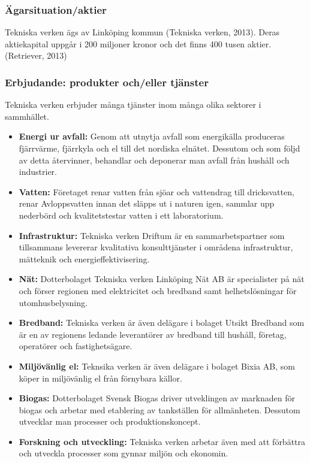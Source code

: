 \documentclass[10pt,a4paper]{article}
\begin{document}
\subsubsection{Ägarsituation/aktier}
Tekniska verken ägs av Linköping kommun (Tekniska verken, 2013). Deras
aktiekapital uppgår i 200 miljoner kronor och det finns 400 tusen
aktier.(Retriever, 2013)

\subsubsection{Erbjudande: produkter och/eller tjänster}
Tekniska verken erbjuder många tjänster inom många olika sektorer i sammhället.
\begin{itemize}
	\item \textbf{Energi ur avfall:} Genom att utnytja avfall som energikälla
	produceras fjärrvärme, fjärrkyla och el till det nordiska elnätet. Dessutom och
	som följd av detta återvinner, behandlar och deponerar man avfall från hushåll
	och industrier.
	\item \textbf{Vatten:} Företaget renar vatten från sjöar och vattendrag till
	dricksvatten, renar Avloppsvatten innan det släpps ut i naturen igen, sammlar
	upp nederbörd och kvalitetstestar vatten i ett laboratorium.
	\item \textbf{Infrastruktur:} Tekniska verken Driftum är en sammarbetspartner
	som tillsammans levererar kvalitativa konsulttjänster i områdena infrastruktur,
	mätteknik och energieffektivisering.
	\item \textbf{Nät:} Dotterbolaget Tekniska verken Linköping Nät AB är
	specialister på nät och förser regionen med elektricitet och bredband samt
	helhetslösningar för utomhusbelysning.
	\item \textbf{Bredband:} Tekniska verken är även delägare i bolaget Utsikt
	Bredband som är en av regionens ledande leverantörer av bredband till hushåll,
	företag, operatörer och fastighetsägare.
	\item \textbf{Miljövänlig el:} Teknsika verken är även delägare i bolaget Bixia
	AB, som köper in miljövänlig el från förnybara källor.
	\item \textbf{Biogas:} Dotterbolaget Svensk Biogas driver utveklingen av
	marknaden för biogas och arbetar med etablering av tankställen för allmänheten.
	Dessutom utvecklar man processer och produktionskoncept.
	\item \textbf{Forskning och utveckling:} Tekniska verken arbetar även med att
	förbättra och utveckla processer som gynnar miljön och ekonomin.
\end{itemize}
\end{document}
